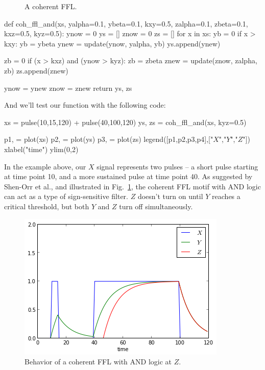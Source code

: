 \begin{figure}[!ht]
\centering
{}
\caption{A coherent FFL.}
\end{figure}
%
\begin{python}
def coh_ffl_and(xs, yalpha=0.1, ybeta=0.1, kxy=0.5, zalpha=0.1, zbeta=0.1, kxz=0.5, kyz=0.5):
    ynow = 0
    ys = []
    znow = 0
    zs = []
    for x in xs:
        yb = 0
        if x > kxy:
            yb = ybeta
        ynew = update(ynow, yalpha, yb)
        ys.append(ynew)

        zb = 0
        if (x > kxz) and (ynow > kyz):
            zb = zbeta
        znew = update(znow, zalpha, zb)
        zs.append(znew)

        ynow = ynew
        znow = znew
    return ys, zs
\end{python}
%
And we'll test our function with the following code:
%
\begin{python}
xs = pulse(10,15,120) + pulse(40,100,120)
ys, zs = coh_ffl_and(xs, kyz=0.5)

p1, = plot(xs)
p2, = plot(ys)
p3, = plot(zs)
legend([p1,p2,p3,p4],["$X$","$Y$","$Z$"])
xlabel("time")
ylim(0,2)
\end{python}
%
In the example above, our $X$ signal represents two pulses -- a short pulse starting at time point 10, and a more sustained pulse at time point 40. As suggested by Shen-Orr et al., and illustrated in Fig.~\ref{fig:cohffland}, the coherent FFL motif with AND logic can act as a type of sign-sensitive filter.  $Z$ doesn't turn on until $Y$ reaches a critical threshold, but both $Y$ and $Z$ turn off simultaneously.
%
\begin{figure}[!ht]
    \centering
    \includegraphics[width=0.33\columnwidth]{./figures/hands-on12/fig-cohffland.png}
    \caption{Behavior of a coherent FFL with AND logic at $Z$.}\label{fig:cohffland}
\end{figure}


